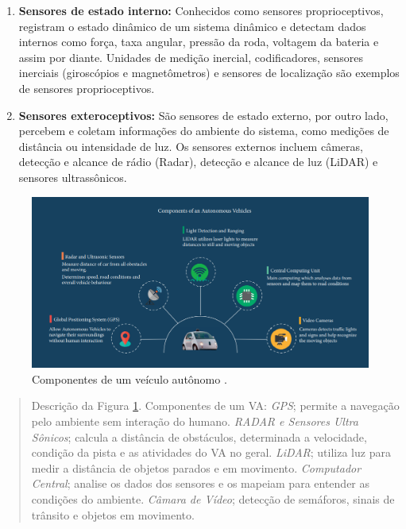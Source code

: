 \begin{enumerate}
 \item \textbf{Sensores de estado interno:} Conhecidos como sensores proprioceptivos, registram o estado dinâmico de um sistema dinâmico e detectam dados internos como força, taxa angular, pressão da roda, voltagem da bateria e assim por diante. Unidades de medição inercial, codificadores, sensores inerciais (giroscópios e magnetômetros) e sensores de localização são exemplos de sensores proprioceptivos. 
\item \textbf{Sensores exteroceptivos:} São sensores de estado externo, por outro lado, percebem e coletam informações do ambiente do sistema, como medições de distância ou intensidade de luz. Os sensores externos incluem câmeras, detecção e alcance de rádio (Radar), detecção e alcance de luz (LiDAR) e sensores ultrassônicos.

\end{enumerate}



\begin{figure}[H]
\centering
\includegraphics[width=\textwidth]{Figures/compo.png}
\caption{Componentes de um veículo autônomo \cite{aplicacao2}.}
\label{figura_compone}
\end{figure}

\begin{quote}
Descrição da Figura \ref{figura_compone}. Componentes de um VA: \textit{GPS}; permite a navegação pelo ambiente sem interação do humano. \textit{RADAR e Sensores Ultra Sônicos}; calcula a distância de obstáculos, determinada a velocidade, condição da pista e as atividades do VA no geral. \textit{LiDAR}; utiliza luz para medir a distância de objetos parados e em movimento. \textit{Computador Central}; analise os dados dos sensores e os mapeiam para entender as condições do ambiente. \textit{Câmara de Vídeo}; detecção de semáforos, sinais de trânsito e objetos em movimento.
\end{quote}

